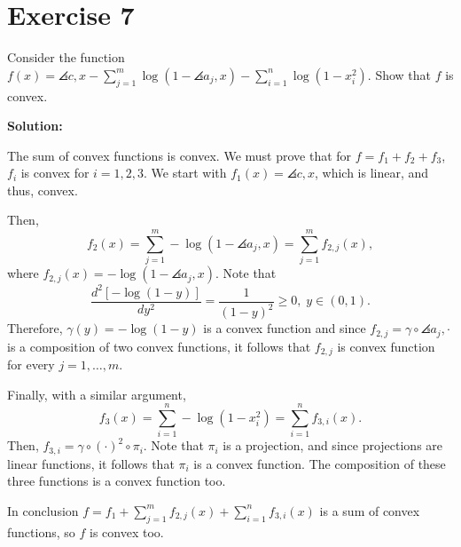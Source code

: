 \section*{Exercise 7}

Consider the function $f(x) = \angles{c,x} - \sum_{j = 1}^{m} \log(1-\angles{a_j, x}) - \sum_{i = 1}^{n}\log(1-x_i^2)$. Show that $f$ is convex. 

\textbf{Solution:}

The sum of convex functions is convex. We must prove that for $f = f_1 + f_2 + f_3 $, $f_i$ is convex for $i = 1,2,3$. We start with $f_1(x) = \angles{c,x}$, which is linear, and thus, convex.

Then,
\[ f_2(x) =  \sum_{j = 1}^{m} -\log(1-\angles{a_j, x}) = \sum_{j = 1}^{m} f_{2,j}(x), \]
where $f_{2,j}(x) = -\log(1-\angles{a_j, x})$. Note that 
\[ \frac{d^2 [-\log(1-y)]}{d y^2} = \frac{1}{(1-y)^2} \geq 0,\; y \in (0,1).  \]
Therefore, $\gamma(y) = -\log(1-y)$ is a convex function and since $f_{2,j} = \gamma \circ \angles{a_j, \cdot}$ is a composition of two convex functions, it follows that $f_{2,j}$ is convex function for every $j = 1,\ldots, m$.

Finally, with a similar argument,
\[  f_3(x) =  \sum_{i = 1}^{n} -\log(1-x_i^2) = \sum_{i = 1}^{n} f_{3,i}(x). \]
Then, $f_{3,i} = \gamma \circ (\cdot)^2 \circ \pi_i$. Note that $\pi_i$ is a projection, and since projections are linear functions, it follows that $\pi_i$ is a convex function. The composition of these three functions is a convex function too.

In conclusion $f = f_1 + \sum_{j = 1}^{m} f_{2,j}(x) + \sum_{i = 1}^{n} f_{3,i}(x)$ is a sum of convex functions, so $f$ is convex too.